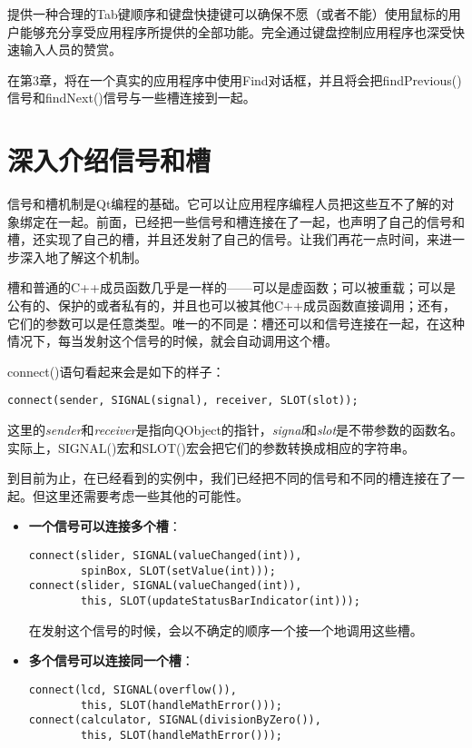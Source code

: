 \documentclass[11pt,oneside]{book}
\begin{document}
\begin{common-format}
提供一种合理的Tab键顺序和键盘快捷键可以确保不愿（或者不能）使用鼠标的用户能够充分享受应用程序所提供的全部功能。完全通过键盘控制应用程序也深受快速输入人员的赞赏。

在第3章，将在一个真实的应用程序中使用Find对话框，并且将会把findPrevious()信号和findNext()信号与一些槽连接到一起。


\section{深入介绍信号和槽}
信号和槽机制是Qt编程的基础。它可以让应用程序编程人员把这些互不了解的对象绑定在一起。前面，已经把一些信号和槽连接在了一起，也声明了自己的信号和槽，还实现了自己的槽，并且还发射了自己的信号。让我们再花一点时间，来进一步深入地了解这个机制。

槽和普通的C++成员函数几乎是一样的——可以是虚函数；可以被重载；可以是公有的、保护的或者私有的，并且也可以被其他C++成员函数直接调用；还有，它们的参数可以是任意类型。唯一的不同是：槽还可以和信号连接在一起，在这种情况下，每当发射这个信号的时候，就会自动调用这个槽。

connect()语句看起来会是如下的样子：
\begin{Verbatim}
connect(sender, SIGNAL(signal), receiver, SLOT(slot));
\end{Verbatim}

这里的\textit{sender}和\textit{receiver}是指向QObject的指针，\textit{signal}和\textit{slot}是不带参数的函数名。实际上，SIGNAL()宏和SLOT()宏会把它们的参数转换成相应的字符串。

到目前为止，在已经看到的实例中，我们已经把不同的信号和不同的槽连接在了一起。但这里还需要考虑一些其他的可能性。

\begin{itemize}
\item \textbf{一个信号可以连接多个槽}：

\begin{Verbatim}
connect(slider, SIGNAL(valueChanged(int)),
        spinBox, SLOT(setValue(int)));
connect(slider, SIGNAL(valueChanged(int)),
        this, SLOT(updateStatusBarIndicator(int)));
\end{Verbatim}

在发射这个信号的时候，会以不确定的顺序一个接一个地调用这些槽。

\item \textbf{多个信号可以连接同一个槽}：
\begin{Verbatim}
connect(lcd, SIGNAL(overflow()),
        this, SLOT(handleMathError()));
connect(calculator, SIGNAL(divisionByZero()),
        this, SLOT(handleMathError()));
\end{Verbatim}


\end{itemize}
\end{common-format}
\end{document}
